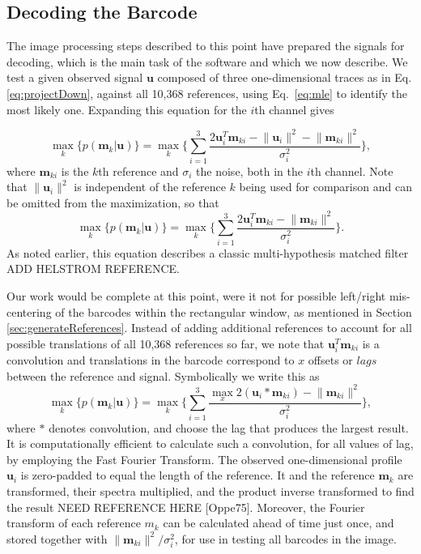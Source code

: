 \subsection{Decoding the Barcode}
The image processing steps described to this point have prepared the signals for decoding, which is the main task of the software and which we now describe.  We test a given observed signal $\mathbf{u}$ composed of three one-dimensional traces as in Eq. 
\ref{eq:projectDown}, against all 10,368 references, using Eq.~\ref{eq:mle} to identify the most likely one. Expanding this equation for the $i$th channel gives

\begin{equation}
\max_k   \big\{  p(\mathbf{m}_k|\mathbf{u}) \big\} =  \max_k  \Bigg\{ \sum_{i=1}^3  \frac{  2 \mathbf{u}_i ^T \mathbf{m}_{ki} - \lVert \mathbf{u}_i \rVert^2  - \lVert \mathbf{m}_{ki} \rVert^2   }{\sigma_i^2}  \Bigg\}, 
\end{equation}
where $\mathbf{m}_{ki}$  is the $k$th reference and $\sigma_i$ the noise, both in the $i$th channel. Note that $\lVert \mathbf{u}_i \rVert^2$  is independent of the reference $k$ being used for comparison and can be omitted from the maximization, so that
\begin{equation}
\max_k   \big\{  p(\mathbf{m}_k|\mathbf{u}) \big\} =  \max_k  \Bigg\{ \sum_{i=1}^3  \frac{  2 \mathbf{u}_i ^T \mathbf{m}_{ki}  - \lVert \mathbf{m}_{ki} \rVert^2   }{\sigma_i^2}  \Bigg\}. 
\end{equation}
As noted earlier, this equation describes a classic multi-hypothesis matched filter ADD HELSTROM REFERENCE.

Our work would be complete at this point, were it not for possible left/right mis-centering of the barcodes within the rectangular window, as mentioned in  Section \ref{sec:generateReferences}. Instead of adding  additional references to account for all possible translations of all 10,368 references so far, we note that $\mathbf{u}_i ^T \mathbf{m}_{ki}$ is a convolution and translations in the barcode correspond to $x$ offsets or $lags$ between the reference and signal. Symbolically we write this as 
\begin{equation}
\max_k   \big\{  p(\mathbf{m}_k|\mathbf{u}) \big\} =  \max_k  \Bigg\{ \sum_{i=1}^3 \frac{  \max_{x} 2 (\mathbf{u}_i * \mathbf{m}_{ki}) - \lVert \mathbf{m}_{ki} \rVert^2   }{\sigma_i^2}  
\Bigg\},
\end{equation}
where $*$ denotes convolution, and choose the lag that produces the largest result.  It is computationally efficient to calculate such a convolution, for all values of lag, by employing the Fast Fourier Transform. The observed one-dimensional profile $\mathbf{u}_i$ is zero-padded to equal the length of the reference. It and the reference $\mathbf{m}_k$ are transformed, their spectra multiplied, and the product inverse transformed to find the result NEED REFERENCE HERE [Oppe75]. Moreover, the Fourier transform of each reference $m_k$ can be calculated ahead of time just once, and stored together with $\lVert \mathbf{m}_{ki} \rVert^2 / \sigma_i^2$, for use in testing all barcodes in the image.  


